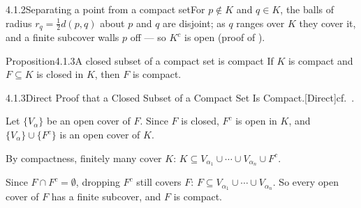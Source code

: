 \documentclass[main.tex]{subfiles}
\begin{document}
\begin{Fig}{4.1.2}{Separating a point from a compact set}{For $p\notin K$ and $q\in K$, the balls of radius $r_q=\tfrac12 d(p,q)$ about $p$ and $q$ are disjoint; as $q$ ranges over $K$ they cover it, and a finite subcover walls $p$ off --- so $K^c$ is open (proof of ).}
\end{Fig}

\begin{Obj}{Proposition}{4.1.3}{A closed subset of a compact set is compact}
If $K$ is compact and $F\subseteq K$ is closed in $K$, then $F$ is compact.
\end{Obj}
\begin{Prf}{4.1.3}{Direct Proof that a Closed Subset of a Compact Set Is Compact.}{[Direct]\quad cf.\ .}
\item Let $\{V_\alpha\}$ be an open cover of $F$. Since $F$ is closed, $F^c$ is open in $K$, and
  $\{V_\alpha\}\cup\{F^c\}$ is an open cover of $K$.
\item By compactness, finitely many cover $K$:
  $K\subseteq V_{\alpha_1}\cup\cdots\cup V_{\alpha_n}\cup F^c$.
\item Since $F\cap F^c=\emptyset$, dropping $F^c$ still covers $F$: $F\subseteq V_{\alpha_1}\cup\cdots
  \cup V_{\alpha_n}$. So every open cover of $F$ has a finite subcover, and $F$ is compact.
\end{Prf}

\end{document}
